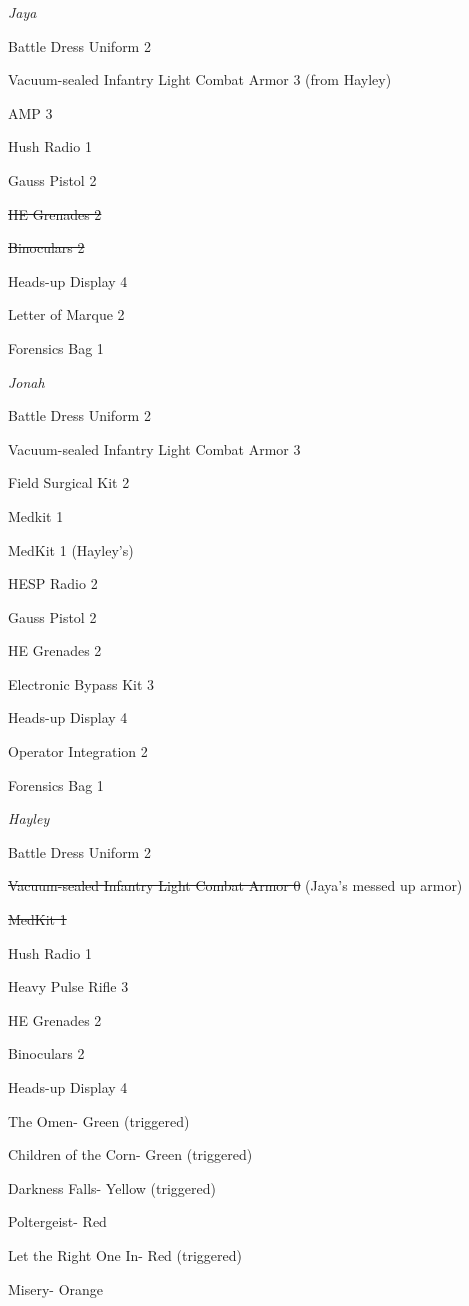 \textit{Jaya}

{\parskip=0pt
Battle Dress Uniform 2

Vacuum-sealed Infantry Light Combat Armor 3 (from Hayley)

AMP 3

Hush Radio 1

Gauss Pistol 2

\sout{ HE Grenades 2 }

\sout{ Binoculars 2 }

Heads-up Display 4

Letter of Marque 2

Forensics Bag 1
}


\textit{Jonah}

{\parskip=0pt
Battle Dress Uniform 2

Vacuum-sealed Infantry Light Combat Armor 3

Field Surgical Kit 2

Medkit 1

MedKit 1 (Hayley's)

HESP Radio 2

Gauss Pistol 2

HE Grenades 2

Electronic Bypass Kit 3

Heads-up Display 4

Operator Integration 2

Forensics Bag 1
}


\textit{Hayley}

{\parskip=0pt
Battle Dress Uniform 2

\sout{ Vacuum-sealed Infantry Light Combat Armor 0 } (Jaya's messed up armor)

\sout{ MedKit 1 }

Hush Radio 1

Heavy Pulse Rifle 3

HE Grenades 2

Binoculars 2

Heads-up Display 4
}


The Omen- Green (triggered)

Children of the Corn- Green (triggered)

Darkness Falls- Yellow (triggered)

Poltergeist- Red

Let the Right One In- Red (triggered)

Misery- Orange



